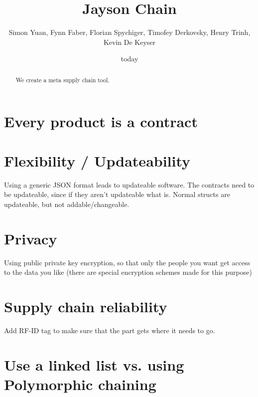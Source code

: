 \documentclass[a4paper,twoside,twocolumn]{article} %
\title{Jayson Chain}
\author{Simon Yuan, Fynn Faber, Florian Spychiger, Timofey Derkovsky, Henry Trinh, Kevin De Keyser}
\begin{document}
\maketitle
\date{today}
\begin{abstract}
	We create a meta supply chain tool.
\end{abstract}


\section{Every product is a contract}


\section{Flexibility / Updateability}
Using a generic JSON format leads to updateable software.
The contracts need to be updateable, since if they aren't updateable what is.
Normal structs are updateable, but not addable/changeable.

\section{Privacy}
Using public private key encryption, so that only the people you want get access to the data you like (there are special encryption schemes made for this purpose)

\section{Supply chain reliability}
Add RF-ID tag to make sure that the part gets where it needs to go.
\section{Use a linked list vs. using Polymorphic chaining}
\end{document}
